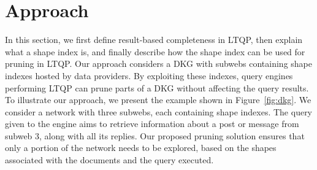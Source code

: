 \section{Approach}\label{sec:approach}






In this section, we first define result-based completeness in LTQP, then explain what a shape index is, and finally describe how the shape index can be used for pruning in LTQP.
Our approach considers a DKG with subwebs containing shape indexes hosted by data providers. 
By exploiting these indexes, query engines performing LTQP can prune parts of a DKG without affecting the query results.
To illustrate our approach, we present the example shown in Figure~\ref{fig:dkg}.
We consider a network with three subwebs, each containing shape indexes.
The query given to the engine aims to retrieve information about a post or message from subweb 3, along with all its replies.
Our proposed pruning solution ensures that only a portion of the network needs to be explored, based on the shapes associated with the documents and the query executed.


